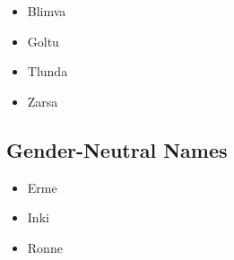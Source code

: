 \begin{itemize}
	\item {} Blimva 
	\item {} Goltu 
	\item {} Tlunda 
	\item {} Zarsa 
\end{itemize}

\subsection{Gender-Neutral Names}
\label{subsec:tvk-names-neut}

\begin{itemize}
	\item {} Erme 
	\item {} Inki 
	\item {} Ronne 
\end{itemize}



